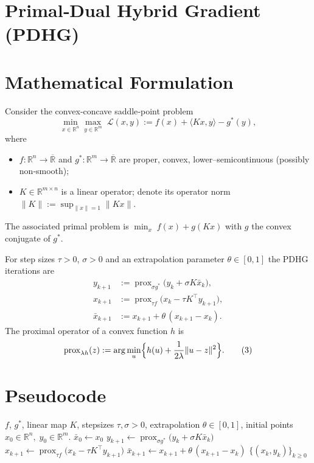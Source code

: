 \documentclass{article}
\newcommand{\prox}{\operatorname{prox}}
\newcommand{\inner}[2]{\langle #1,#2\rangle}
\newcommand{\R}{\mathbb{R}}
\begin{document}
\section*{Primal‑Dual Hybrid Gradient (PDHG)}

\section*{Mathematical Formulation}
Consider the convex‑concave saddle‑point problem  
\[
\min_{x\in\R^{n}} \max_{y\in\R^{m}} \; \mathcal L(x,y)
:= f(x) + \inner{Kx}{y} - g^{*}(y),
\tag{1}
\]
where  

\begin{itemize}[nosep]
\item $f:\R^{n}\to\overline{\R}$ and $g^{*}:\R^{m}\to\overline{\R}$ are proper, convex, lower–semicontinuous (possibly non‑smooth);
\item $K\in\R^{m\times n}$ is a linear operator; denote its operator norm $\|K\|:=\sup_{\|x\|=1}\|Kx\|$.
\end{itemize}
The associated primal problem is $\min_{x} \; f(x)+g(Kx)$ with $g$ the convex conjugate of $g^{*}$.

For step sizes $\tau>0$, $\sigma>0$ and an extrapolation parameter $\theta\in[0,1]$ the PDHG iterations are
\[
\begin{aligned}
y_{k+1} &:= \prox_{\sigma g^{*}}\!\bigl(y_{k}+ \sigma K\bar x_{k}\bigr), \tag{2a}\\[4pt]
x_{k+1} &:= \prox_{\tau f}\!\bigl(x_{k}-\tau K^{\!\top} y_{k+1}\bigr), \tag{2b}\\[4pt]
\bar x_{k+1} &:= x_{k+1}+ \theta\,(x_{k+1}-x_{k}). \tag{2c}
\end{aligned}
\]
The proximal operator of a convex function $h$ is
\[
\prox_{\lambda h}(z) := \arg\min_{u}\Bigl\{ h(u)+\frac{1}{2\lambda}\|u-z\|^{2}\Bigr\}.
\tag{3}
\]

\section*{Pseudocode}
\begin{algorithm}[H]
\caption{Primal‑Dual Hybrid Gradient (PDHG)}
\begin{algorithmic}[1]
\Require $f$, $g^{*}$, linear map $K$, stepsizes $\tau,\sigma>0$, extrapolation $\theta\in[0,1]$, 
initial points $x_{0}\in\R^{n},\;y_{0}\in\R^{m}$.
\State $\bar x_{0}\gets x_{0}$
    \State $y_{k+1}\gets \prox_{\sigma g^{*}}\!\bigl(y_{k}+ \sigma K\bar x_{k}\bigr)$ 
    \State $x_{k+1}\gets \prox_{\tau f}\!\bigl(x_{k}-\tau K^{\!\top} y_{k+1}\bigr)$ 
    \State $\bar x_{k+1}\gets x_{k+1}+ \theta\,(x_{k+1}-x_{k})$ 
\EndFor
\State \Return $\{(x_{k},y_{k})\}_{k\ge 0}$
\end{algorithmic}
\end{algorithm}
\end{document}
